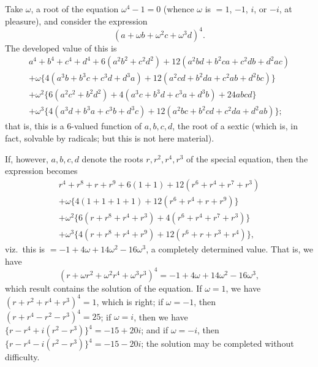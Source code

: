 \documentclass[11pt,a4paper]{book}
\begin{document}
Take $\omega$, a root of the equation $\omega^{4} - 1 = 0$ (whence $\omega$ is $= 1$, $-1$, $i$, or $-i$, at pleasure), and consider the expression
\[
(a + \omega b + \omega^{2}c + \omega^{3}d)^{4}.
\]
The developed value of this is
\begin{multline*}
a^{4} + b^{4} + c^{4} + d^{4} + 6(a^{2}b^{2} + c^{2}d^{2}) + 12(a^{2}bd + b^{2}ca + c^{2}db + d^{2}ac) \\
+ \omega\{4(a^{3}b + b^{3}c + c^{3}d + d^{3}a) + 12(a^{2}cd + b^{2}da + c^{2}ab + d^{2}bc)\} \\
+ \omega^{2}\{6(a^{2}c^{2} + b^{2}d^{2}) + 4(a^{3}c + b^{3}d + c^{3}a + d^{3}b) + 24abcd\} \\
+ \omega^{3}\{4(a^{3}d + b^{3}a + c^{3}b + d^{3}c) + 12(a^{2}bc + b^{2}cd + c^{2}da + d^{2}ab)\};
\end{multline*}
that is, this is a 6-valued function of $a, b, c, d$, the root of a sextic (which is, in fact, solvable by radicals; but this is not here material).

If, however, $a, b, c, d$ denote the roots $r, r^{2}, r^{4}, r^{3}$ of the special equation, then the expression becomes
\begin{multline*}
r^{4} + r^{8} + r + r^{9} + 6(1 + 1) + 12(r^{6} + r^{4} + r^{7} + r^{3}) \\
+ \omega\{4(1 + 1 + 1 + 1) + 12(r^{6} + r^{4} + r + r^{9})\} \\
+ \omega^{2}\{6(r + r^{8} + r^{4} + r^{3}) + 4(r^{6} + r^{4} + r^{7} + r^{3})\} \\
+ \omega^{3}\{4(r + r^{8} + r^{4} + r^{9}) + 12(r^{6} + r + r^{3} + r^{4})\},
\end{multline*}
viz.\ this is $= -1 + 4\omega + 14\omega^{2} - 16\omega^{3}$, a completely determined value. That is, we have
\[
(r + \omega r^{2} + \omega^{2}r^{4} + \omega^{3}r^{3})^{4} = -1 + 4\omega + 14\omega^{2} - 16\omega^{3},
\]
which result contains the solution of the equation. If $\omega = 1$, we have $(r + r^{2} + r^{4} + r^{3})^{4} = 1$, which is right; if $\omega = -1$, then $(r + r^{4} - r^{2} - r^{3})^{4} = 25$; if $\omega = i$, then we have $\{r - r^{4} + i(r^{2} - r^{3})\}^{4} = -15 + 20i$; and if $\omega = -i$, then $\{r - r^{4} - i(r^{2} - r^{3})\}^{4} = -15 - 20i$; the solution may be completed without difficulty.
\end{document}

